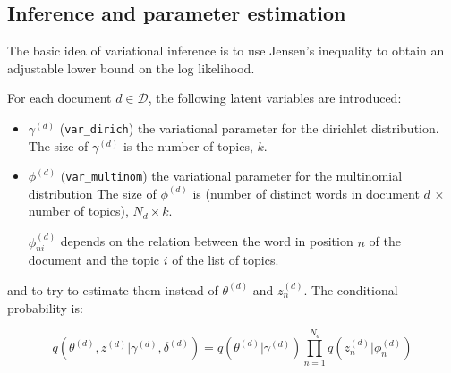 \documentclass{article}
\begin{document}
\subsection{Inference and parameter estimation}

The basic idea of variational inference is to use Jensen's inequality to obtain an adjustable lower bound on the log likelihood.

For each document $d \in \mathcal{D}$, the following latent variables are introduced:
 \begin{itemize}
\setlength\itemsep{-0.2em}
  \item $\gamma^{(d)}$ (\verb"var_dirich") the variational parameter for the dirichlet distribution. The size of $\gamma^{(d)}$ is the number of topics, $k$.
  \item $\phi^{(d)}$ (\verb"var_multinom") the variational parameter for the multinomial distribution The size of $\phi^{(d)}$ is (number of distinct words in document $d$ $\times$ number of topics), $N_d \times k$.
  
  $\phi_{ni}^{(d)}$ depends on the relation between the word in position $n$ of the document and the topic $i$ of the list of topics.
   \end{itemize}

and to try to estimate them instead of $\theta^{(d)}$ and $z_n^{(d)}$. The conditional probability is:

\[ q(\theta^{(d)}, z^{(d)}|\gamma^{(d)}, \delta^{(d)}) = q(\theta^{(d)}|\gamma^{(d)}) \prod_{n=1}^{N_d} q(z_n^{(d)}|\phi_n^{(d)})\]
\end{document}
